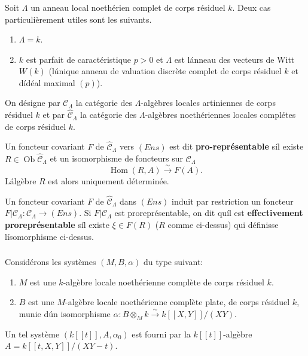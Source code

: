 \documentclass{amsart}
\theoremstyle{plain}
\theoremstyle{remark}
\DeclareMathOperator{\Hom}{Hom}
\DeclareMathOperator{\Ob}{Ob}
\begin{document}
\subsubsection{}
Soit $\Lambda$ un anneau local noeth\'erien complet de corps r\'esiduel $k$. Deux cas
particuli\`erement utiles sont les suivants.
\begin{enumerate}
\item[(a)] $\Lambda = k$.
\item[(b)] $k$ est parfait de caract\'eristique $p > 0$ et $\Lambda$ est l\'anneau des vecteurs de
Witt $W(k)$ (l\'unique anneau de valuation discr\`ete complet de corps r\'esiduel $k$ et
d\'id\'eal maximal $(p)$).
\end{enumerate}
On d\'esigne par $\mathcal{C}_\Lambda$ la cat\'egorie des $\Lambda$-alg\`ebres locales artiniennes de
corps r\'esiduel $k$ et par $\widehat{\mathcal{C}}_\Lambda$ la cat\'egorie des $\Lambda$-alg\`ebres noeth\'eriennes
locales compl\'etes de corps r\'esiduel $k$.

Un foncteur covariant $F$ de $\widehat{\mathcal{C}}_\Lambda$ vers $(Ens)$ est dit
\textbf{pro-repr\'esentable} s\'il existe $R \in \Ob \widehat{\mathcal{C}}_\Lambda$ et un isomorphisme
de foncteurs sur $\mathcal{C}_\Lambda$
\begin{equation}
\Hom(R, A) \xrightarrow{\sim} F(A).
\end{equation}
L\'alg\`ebre $R$ est alors uniquement d\'etermin\'ee.

Un foncteur covariant $F$ de $\widehat{\mathcal{C}}_\Lambda$ dans $(Ens)$ induit par restriction un
foncteur $F|\mathcal{C}_\Lambda: \mathcal{C}_\Lambda \to (Ens)$. Si $F|\mathcal{C}_\Lambda$ est
prorepr\'esentable, on dit qu\'il est \textbf{effectivement prorepr\'esentable} s\'il existe
$\xi \in F(R)$ ($R$ comme ci-dessus) qui d\'efinisse l\'isomorphisme ci-dessus.

\subsubsection{}
Consid\'erons les syst\`emes $(M, B, \alpha)$ du type suivant:
\begin{enumerate}
\item[(a)] $M$ est une $k$-alg\`ebre locale noeth\'erienne compl\`ete de corps r\'esiduel $k$.
\item[(b)] $B$ est une $M$-alg\`ebre locale noeth\'erienne compl\`ete plate, de corps
r\'esiduel $k$, munie d\'un isomorphisme $\alpha: B \otimes_M k \xrightarrow{\sim} k[[X,Y]]/(XY)$.
\end{enumerate}
Un tel syst\`eme $(k[[t]], A, \alpha_0)$ est fourni par la $k[[t]]$-alg\`ebre
$A = k[[t,X,Y]]/(XY-t)$.
\end{document}
